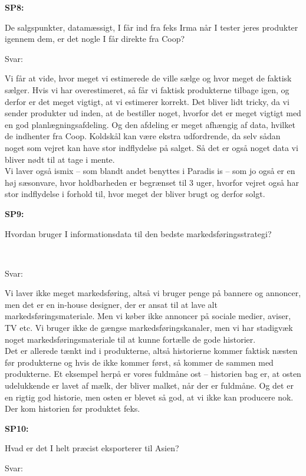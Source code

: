 \documentclass[
  12pt,
  a4paper,
  DIV=11,
  numbers=noendperiod]{scrartcl}
\begin{document}
\begin{itemize}
  \textbf{SP8:}~

  De salgspunkter, datamæssigt, I får ind fra feks Irma når I tester
  jeres produkter igennem dem, er det nogle I får direkte fra Coop?~

  Svar:~

  Vi får at vide, hvor meget vi estimerede de ville sælge og hvor meget
  de faktisk sælger. Hvis vi har overestimeret, så får vi faktisk
  produkterne tilbage igen, og derfor er det meget vigtigt, at vi
  estimerer korrekt. Det bliver lidt tricky, da vi sender produkter ud
  inden, at de bestiller noget, hvorfor det er meget vigtigt med en god
  planlægningsafdeling. Og den afdeling er meget afhængig af data,
  hvilket de indhenter fra Coop. Koldskål kan være ekstra udfordrende,
  da selv sådan noget som vejret kan have stor indflydelse på salget. Så
  det er også noget data vi bliver nødt til at tage i mente.~\\
  Vi laver også ismix -- som blandt andet benyttes i Paradis is -- som
  jo også er en høj sæsonvare, hvor holdbarheden er begrænset til 3
  uger, hvorfor vejret også har stor indflydelse i forhold til, hvor
  meget der bliver brugt og derfor solgt.~~

  \textbf{SP9:}~

  Hvordan bruger I informationsdata til den bedste
  markedsføringsstrategi?~~

  ~

  Svar:~

  Vi laver ikke meget markedsføring, altså vi bruger penge på bannere og
  annoncer, men det er en in-house designer, der er ansat til at lave
  alt markedsføringsmateriale. Men vi køber ikke annoncer på sociale
  medier, aviser, TV etc. Vi bruger ikke de gængse
  markedsføringskanaler, men vi har stadigvæk noget
  markedsføringsmateriale til at kunne fortælle de gode historier. ~\\
  Det er allerede tænkt ind i produkterne, altså historierne kommer
  faktisk næsten før produkterne og hvis de ikke kommer først, så kommer
  de sammen med produkterne. Et eksempel herpå er vores fuldmåne ost --
  historien bag er, at osten udelukkende er lavet af mælk, der bliver
  malket, når der er fuldmåne. Og det er en rigtig god historie, men
  osten er blevet så god, at vi ikke kan producere nok. Der kom
  historien før produktet feks.~~

  \textbf{SP10:}~

  Hvad er det I helt præcist eksporterer til Asien?~

  Svar:~~


\end{itemize}
\end{document}
